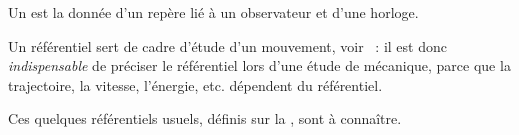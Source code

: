 \documentclass[12pt,fancy]{cours}
\begin{document}
\begin{definition}[Référentiel]
Un  est la donnée d’un repère lié à un observateur et d'une horloge.
\end{definition}

\begin{danger}
  Un référentiel sert de cadre d'étude d'un mouvement, voir ~: il est donc \textit{indispensable} de préciser le référentiel lors d'une étude de mécanique, parce que la trajectoire, la vitesse, l’énergie, etc. dépendent du référentiel. 
\end{danger}



Ces quelques référentiels usuels, définis sur la , sont à connaître.
\end{document}

